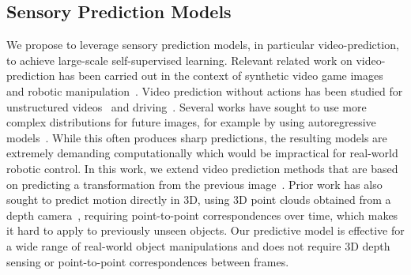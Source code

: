 \subsection{Sensory Prediction Models}
We propose to leverage sensory prediction models, in particular video-prediction, to achieve large-scale self-supervised learning. Relevant related work on video-prediction has been carried out in the context of synthetic video game images~\cite{atarioh,recurrentsimulators} and robotic manipulation~\cite{bootsetal,finn_nips,video_pixel_networks}. Video prediction without actions has been studied for unstructured videos~\cite{beyond_mse,convlstm,vondrick} and driving~\cite{prednet,dynamic_filter_networks}. Several works have sought to use more complex distributions for future images, for example by using autoregressive models~\cite{video_pixel_networks,scott_reed}. While this often produces sharp predictions, the resulting models are extremely demanding computationally which would be impractical for real-world robotic control. In this work, we extend video prediction methods that are based on predicting a transformation from the previous image~\cite{finn_nips,dynamic_filter_networks}. Prior work has also sought to predict motion directly in 3D, using 3D point clouds obtained from a depth camera~\cite{se3}, requiring point-to-point correspondences over time, which makes it hard to apply to previously unseen objects. Our predictive model is effective for a wide range of real-world object manipulations and does not require 3D depth sensing or point-to-point correspondences between frames.

